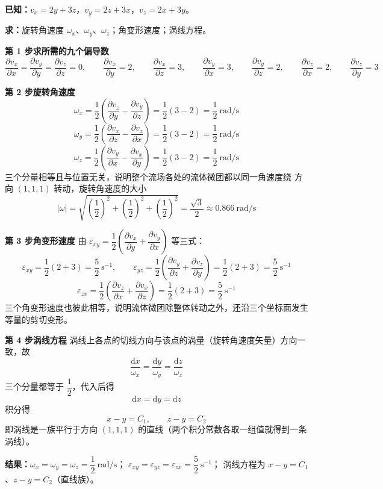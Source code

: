 \begin{jie}
\textbf{已知：}$v_x=2y+3z$，$v_y=2z+3x$，$v_z=2x+3y$。

\textbf{求：}旋转角速度 $\omega_x$、$\omega_y$、$\omega_z$；角变形速度；涡线方程。

\textbf{第 1 步\quad 求所需的九个偏导数}
\[ \frac{\partial v_x}{\partial x}=\frac{\partial v_y}{\partial y}=\frac{\partial v_z}{\partial z}=0,\qquad
   \frac{\partial v_x}{\partial y}=2,\qquad \frac{\partial v_x}{\partial z}=3,\qquad
   \frac{\partial v_y}{\partial x}=3,\qquad \frac{\partial v_y}{\partial z}=2,\qquad
   \frac{\partial v_z}{\partial x}=2,\qquad \frac{\partial v_z}{\partial y}=3 \]

\textbf{第 2 步\quad 旋转角速度}
\[ \omega_x=\frac{1}{2}\left(\frac{\partial v_z}{\partial y}-\frac{\partial v_y}{\partial z}\right)=\frac{1}{2}(3-2)=\frac{1}{2}\ \mathrm{rad/s} \]
\[ \omega_y=\frac{1}{2}\left(\frac{\partial v_x}{\partial z}-\frac{\partial v_z}{\partial x}\right)=\frac{1}{2}(3-2)=\frac{1}{2}\ \mathrm{rad/s} \]
\[ \omega_z=\frac{1}{2}\left(\frac{\partial v_y}{\partial x}-\frac{\partial v_x}{\partial y}\right)=\frac{1}{2}(3-2)=\frac{1}{2}\ \mathrm{rad/s} \]
三个分量相等且与位置无关，说明整个流场各处的流体微团都以同一角速度绕
方向 $(1,1,1)$ 转动，旋转角速度的大小
\[ |\omega|=\sqrt{\left(\frac{1}{2}\right)^2+\left(\frac{1}{2}\right)^2+\left(\frac{1}{2}\right)^2}
 =\frac{\sqrt{3}}{2}\approx0.866\ \mathrm{rad/s} \]

\textbf{第 3 步\quad 角变形速度}
由 $\varepsilon_{xy}=\dfrac{1}{2}\left(\dfrac{\partial v_x}{\partial y}+\dfrac{\partial v_y}{\partial x}\right)$ 等三式：
\[ \varepsilon_{xy}=\frac{1}{2}(2+3)=\frac{5}{2}\ \mathrm{s^{-1}},\qquad
   \varepsilon_{yz}=\frac{1}{2}\left(\frac{\partial v_y}{\partial z}+\frac{\partial v_z}{\partial y}\right)=\frac{1}{2}(2+3)=\frac{5}{2}\ \mathrm{s^{-1}} \]
\[ \varepsilon_{zx}=\frac{1}{2}\left(\frac{\partial v_z}{\partial x}+\frac{\partial v_x}{\partial z}\right)=\frac{1}{2}(2+3)=\frac{5}{2}\ \mathrm{s^{-1}} \]
三个角变形速度也彼此相等，说明流体微团除整体转动之外，还沿三个坐标面发生等量的剪切变形。

\textbf{第 4 步\quad 涡线方程}
涡线上各点的切线方向与该点的涡量（旋转角速度矢量）方向一致，故
\[ \frac{\mathrm{d}x}{\omega_x}=\frac{\mathrm{d}y}{\omega_y}=\frac{\mathrm{d}z}{\omega_z} \]
三个分量都等于 $\dfrac{1}{2}$，代入后得
\[ \mathrm{d}x=\mathrm{d}y=\mathrm{d}z \]
积分得
\[ x-y=C_1,\qquad z-y=C_2 \]
即涡线是一族平行于方向 $(1,1,1)$ 的直线（两个积分常数各取一组值就得到一条涡线）。

\textbf{结果：}$\omega_x=\omega_y=\omega_z=\dfrac{1}{2}\ \mathrm{rad/s}$；
$\varepsilon_{xy}=\varepsilon_{yz}=\varepsilon_{zx}=\dfrac{5}{2}\ \mathrm{s^{-1}}$；
涡线方程为 $x-y=C_1$、$z-y=C_2$（直线族）。
\end{jie}

